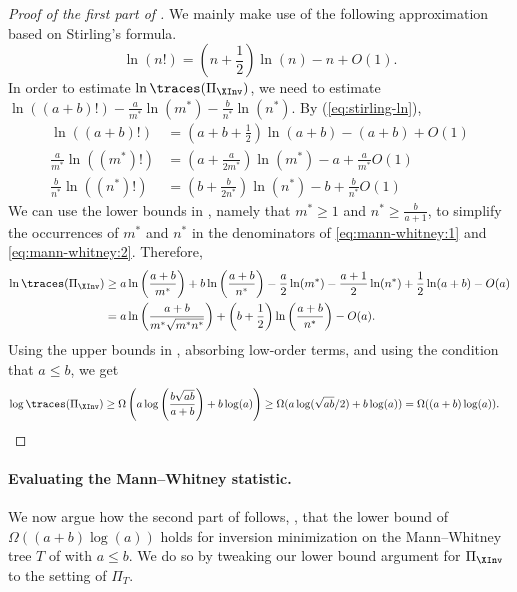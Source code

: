 \begin{proof}[Proof of the first part of ]
We mainly make use of the following approximation based on Stirling's formula.
    \begin{equation}
        \label{eq:stirling-ln}
        \ln(n!) = \left(n+\frac{1}{2}\right)\ln(n)-n+O(1).
    \end{equation}
    In order to estimate $\ln \traces(\Pi_{\XInv})$, we need to estimate $\ln((a+b)!)-\frac{a}{m^*}\ln(m^*)-\frac{b}{n^*}\ln(n^*)$. By (\ref{eq:stirling-ln}),
    \begin{align}
        \ln((a+b)!) &= \left(a+b+\frac{1}{2}\right)\ln(a+b) - (a+b) + O(1)\\
        \frac{a}{m^*}\ln((m^*)!) &= \left(a+\frac{a}{2m^*}\right)\ln(m^*) - a + \frac{a}{m^*}O(1) \label{eq:mann-whitney:1}\\
        \frac{b}{n^*}\ln((n^*)!) &= \left(b+\frac{b}{2n^*}\right)\ln(n^*) - b + \frac{b}{n^*}O(1) \label{eq:mann-whitney:2}
    \end{align}
    We can use the lower bounds in , namely that $m^*\ge 1$ and $n^*\ge \frac{b}{a+1}$, to simplify the occurrences of $m^*$ and $n^*$ in the denominators of \eqref{eq:mann-whitney:1} and \eqref{eq:mann-whitney:2}. Therefore,
    \begin{align*}
        \ln \traces(\Pi_{\XInv}) &\ge a\ln\left(\frac{a+b}{m^*}\right)+b\ln\left(\frac{a+b}{n^*}\right) - \frac{a}{2}\ln(m^*) - \frac{a+1}{2}\ln(n^*) + \frac{1}{2}\ln(a+b) - O(a)\\
        &= a\ln\left(\frac{a+b}{m^*\sqrt{m^*n^*}}\right)+\left(b+\frac{1}{2}\right)\ln\left(\frac{a+b}{n^*}\right)- O(a).
    \end{align*}
    Using the upper bounds in , absorbing low-order terms, and using the condition that $a \le b$, we get
    \begin{align*}
        \log \traces(\Pi_{\XInv}) &\ge \Omega\left(a \log\left(\frac{b\sqrt{ab}}{a+b}\right) + b \log(a)\right) \ge \Omega(a \log(\sqrt{ab}/2) + b \log(a)) = 
        \Omega((a+b)\log(a)).
    \end{align*}
\end{proof}

\paragraph{Evaluating the Mann--Whitney statistic.} 
We now argue how the second part of  follows, \ie, that the lower bound of $\Omega((a+b)\log(a))$ holds for inversion minimization on the Mann--Whitney tree $T$ of  with $a \le b$. We do so by tweaking our lower bound argument for $\Pi_{\XInv}$ to the setting of $\Pi_T$.

